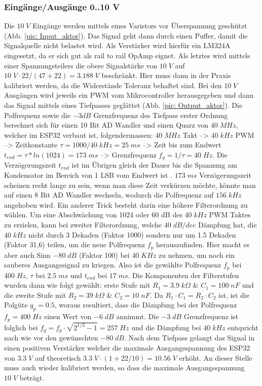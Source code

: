 \subsubsection{Eingänge/Ausgänge 0..10 V }
Die $10\;V$ Eingänge werden mittels eines Varistors vor Überspannung geschützt (Abb. \ref{pic: Input_aktor}). Das Signal geht dann durch einen Puffer, damit die Signalquelle nicht belastet wird. Als Verstärker wird hierfür ein LM324A eingesetzt, da er sich gut als rail to rail OpAmp eignet. Als letztes wird mittels einer Spannungsteilers die obere Signalstärke von $10\;V$ auf $ 10\;V \cdot 22/(47+22) = 3.188\;V$ beschränkt. Hier muss dann in der Praxis kalibriert werden, da die Widerstände Toleranz behaftet sind. Bei den $10\;V$ Ausgängen wird jeweils ein PWM vom Mikrocontroller herausgegeben und dann das Signal mittels eines Tiefpasses geglättet (Abb. \ref{pic: Output_aktor}). Die Polfrequenz sowie die $-3dB$ Grenzfrequenz des Tiefpass erster Ordnung berechnet sich für einen 10 Bit AD Wandler und einen Quarz von $40\;MHz$, welcher im ESP32 verbaut ist, folgendermassen: $40\;MHz$ Takt --> $40\;kHz$ PWM --> Zeitkonstante $\tau = 1000/40\;kHz = 25\;ms $ --> Zeit bis zum Endwert $ t_{end}=\tau * ln(1024) = 173\;ms$ --> Grenzfrequenz $f_g = 1/\tau = 40\;Hz$. Die Verzögerungszeit $t_{end}$ ist im Übrigen gleich der Dauer bis die Spannung am Kondensator im Bereich von 1 LSB vom Endwert ist \cite{ronald_locher_2017}. $173\;ms$ Verzögerungszeit scheinen recht lange zu sein, wenn man diese Zeit verkürzen möchte, könnte man auf einen 8 Bit AD Wandler wechseln, wodurch die Polfrequenz auf $156\;kHz$ angehoben wird. Ein anderer Trick besteht darin eine höhere Filterordnung zu wählen. Um eine Abschwächung von 1024 oder 60 dB des $40\;kHz$ PWM Taktes zu erzielen, kann bei zweiter Filterordnung, welche $40\;dB/dec$ Dämpfung hat, die $40\;kHz$ nicht durch 3 Dekaden (Faktor 1000) sondern nur um 1.5 Dekaden (Faktor 31,6) teilen, um die neue Polfrequenz $f_p$ herauszufinden. Hier macht es aber auch Sinn $-80\;dB$ (Faktor 100) bei $40\;KHz$ zu nehmen, um noch ein sauberes Ausgangssignal zu kriegen. Also ist die gewählte Polfrequenz $f_p$ bei $400\;Hz$, $\tau$ bei $2.5\;ms$ und $ t_{end}$ bei $17\;ms$. Die Komponenten der Filterstufen wurden dann wie folgt gewählt: erste Stufe mit $R_1 = 3.9\;k \Omega $ \& $C_1 = 100\;nF$ und die zweite Stufe mit $R_2 = 39\;k \Omega $ \& $C_2 = 10\;nF$. Da $R_1 \cdot C_1 = R_2 \cdot C_2$ ist, ist die Polgüte $q_p = 0.5$, woraus resultiert, dass die Dämpfung bei der Polfrequenz $f_p = 400\;Hz$ einen Wert von $-6\;dB$ annimmt. Die $-3\;dB$ Grenzfrequenz ist folglich bei $f_g = f_p \cdot \sqrt{2^{1/2}-1} = 257\;Hz$ \cite{miller_rc-glied_nodate} und die Dämpfung bei $40\;kHz$ entspricht nach wie vor den gewünschten $-80\;dB$. Nach dem Tiefpass gelangt das Signal in einen positiven Verstärker welcher die maximale Ausgangsspannung des ESP32 von $3.3\;V$ auf theoretisch $ 3.3\;V \cdot (1+ 22/10) = 10.56\;V$ erhöht. An dieser Stelle muss auch wieder kalibriert werden, so dass die maximale Ausgangsspannung $10\;V$ beträgt.
